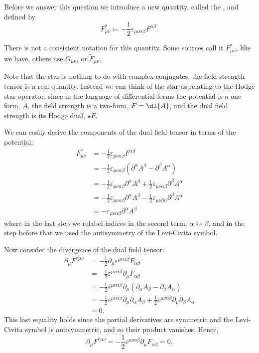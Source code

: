 Before we answer this question we introduce a new quantity, called the , and defined by
\begin{equation}
    F^*_{\mu\nu} \coloneqq -\frac{1}{2}\varepsilon_{\mu\nu\alpha\beta}F^{\alpha\beta}.
\end{equation}
\begin{ntn}{}{}
    There is not a consistent notation for this quantity.
    Some sources call it \(F^*_{\mu\nu}\), like we have, others use \(G_{\mu\nu}\), or \(\tilde{F}_{\mu\nu}\).
    
    Note that the star is nothing to do with complex conjugates, the field strength tensor is a real quantity.
    Instead we can think of the star as relating to the Hodge star operator, since in the language of differential forms the potential is a one-form, \(A\), the field strength is a two-form, \(F = \dl{A}\), and the dual field strength is its Hodge dual, \(\star F\).
\end{ntn}
We can easily derive the components of the dual field tensor in terms of the potential:
\begin{align}
    F^*_{\mu\nu} &= -\frac{1}{2}\varepsilon_{\mu\nu\alpha\beta}F^{\alpha\beta}\\
    &= -\frac{1}{2}\varepsilon_{\mu\nu\alpha\beta}(\partial^\alpha A^\beta - \partial^\beta A^\alpha)\\
    &= -\frac{1}{2}\varepsilon_{\mu\nu\alpha\beta}\partial^\alpha A^\beta + \frac{1}{2}\varepsilon_{\mu\nu\alpha\beta} \partial^\beta A^\alpha\\
    &= -\frac{1}{2}\varepsilon_{\mu\nu\alpha\beta}\partial^\alpha A^\beta - \frac{1}{2}\varepsilon_{\mu\nu\beta\alpha} \partial^\beta A^\alpha\\
    &= -\varepsilon_{\mu\nu\alpha\beta}\partial^\alpha A^\beta
\end{align}
where in the last step we relabel indices in the second term, \(\alpha \leftrightarrow \beta\), and in the step before that we used the antisymmetry of the Levi-Civita symbol.

Now consider the divergence of the dual field tensor:
\begin{align}
    \partial_\mu F^{*\mu\nu} &= -\frac{1}{2}\partial_\mu \varepsilon^{\mu\nu\alpha\beta}F_{\alpha\beta}\\
    &= -\frac{1}{2}\varepsilon^{\mu\nu\alpha\beta}\partial_\mu F_{\alpha\beta}\\
    &= -\frac{1}{2}\varepsilon^{\mu\nu\alpha\beta}\partial_\mu (\partial_\alpha A_\beta - \partial_\beta A_\alpha)\\
    &= -\frac{1}{2}\varepsilon^{\mu\nu\alpha\beta}\partial_\mu\partial_\alpha A_\beta + \frac{1}{2}\varepsilon^{\mu\nu\alpha\beta}\partial_\mu\partial_\beta A_\alpha\\
    &= 0.
\end{align}
This last equality holds since the partial derivatives are symmetric and the Levi-Civita symbol is antisymmetric, and so their product vanishes.
Hence,
\begin{equation}
    \partial_\mu F^{*\mu\nu} = -\frac{1}{2}\varepsilon^{\mu\nu\alpha\beta}\partial_\mu F_{\alpha\beta} = 0.
\end{equation}

